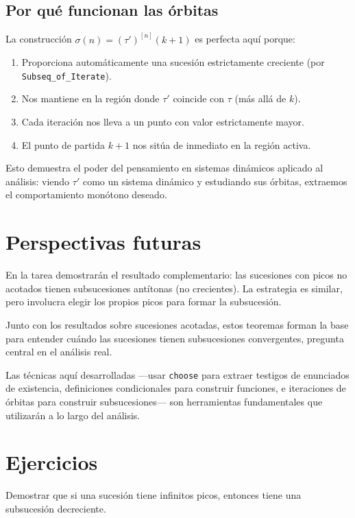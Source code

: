 \subsection{Por qué funcionan las órbitas}

La construcción $\sigma(n)=(\tau')^{[n]}(k+1)$ es perfecta aquí porque:
\begin{enumerate}
  \item Proporciona automáticamente una sucesión estrictamente creciente
        (por \texttt{Subseq\_of\_Iterate}).
  \item Nos mantiene en la región donde $\tau'$ coincide con $\tau$
        (más allá de $k$).
  \item Cada iteración nos lleva a un punto con valor estrictamente mayor.
  \item El punto de partida $k+1$ nos sitúa de inmediato en la región activa.
\end{enumerate}

Esto demuestra el poder del pensamiento en sistemas dinámicos aplicado al
análisis: viendo $\tau'$ como un sistema dinámico y estudiando sus órbitas,
extraemos el comportamiento monótono deseado.

\section{Perspectivas futuras}

En la tarea demostrarán el resultado complementario: las sucesiones con picos
no acotados tienen subsucesiones antítonas (no crecientes). La estrategia es
similar, pero involucra elegir los propios picos para formar la subsucesión.

Junto con los resultados sobre sucesiones acotadas, estos teoremas forman la
base para entender cuándo las sucesiones tienen subsucesiones convergentes,
pregunta central en el análisis real.

Las técnicas aquí desarrolladas ---usar \texttt{choose} para extraer testigos
de enunciados de existencia, definiciones condicionales para construir
funciones, e iteraciones de órbitas para construir subsucesiones--- son
herramientas fundamentales que utilizarán a lo largo del análisis.

\section{Ejercicios}

\begin{ejercicio}
  Demostrar que si una sucesión tiene infinitos picos,
  entonces tiene una subsucesión decreciente.
\end{ejercicio}

